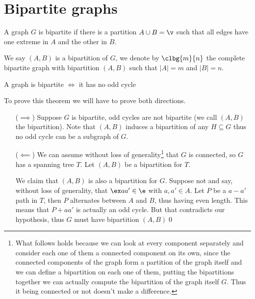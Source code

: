 \chapter{Bipartite graphs}
\begin{definition}
    A graph $G$ is bipartite if there is a partition $A \cup B = \v$ such that all edges have one extreme in $A$ and the other in $B$.
\end{definition}
We say $(A, B)$ is a bipartition of $G$, we denote by $\clbg{m}{n}$ the complete bipartite graph with bipartition $(A, B)$ such that $|A| = m$ and $|B| = n$.
\begin{customproposition}{1.24}
    \label{proposition:1.24}
    A graph is bipartite $\iff$ it has no odd cycle
\end{customproposition}
\begin{prf}
    To prove this theorem we will have to prove both directions.
    \begin{itemize}
        \item [($\implies$)] Suppose $G$ is bipartite, odd cycles are not bipartite (we call $(A, B)$ the bipartition). Note that $(A, B)$ induces a bipartition of any $H \subseteq G$ thus no odd cycle can be a subgraph of $G$.
        \item [($\impliedby$)] We can assume without loss of generality\footnote{What follows holds because we can look at every component separately and consider each one of them a connected component on its own, since the connected components of the graph form a partition of the graph itself and we can define a bipartition on each one of them, putting the bipartitions together we can actually compute the bipartition of the graph itself $G$. Thus it being connected or not doesn't make a difference.} that $G$ is connected, so $G$ has a spanning tree $T$. Let $(A, B)$ be a bipartition for $T$.
        
        We claim that $(A, B)$ is also a bipartition for $G$. Suppose not and say, without loss of generality, that $\ex aa' \in \e$ with $a, a' \in A$. Let $P$ be a $a - a'$ path in $T$, then $P$ alternates between $A$ and $B$, thus having even length. This means that $P + aa'$ is actually an odd cycle. But that contradicts our hypothesis, thus $G$ must have bipartition $(A, B)$\qed
    \end{itemize}
\end{prf}
